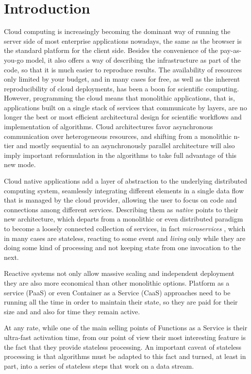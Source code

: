 \documentclass{llncs}
\begin{document}
\section{Introduction}
Cloud computing is increasingly becoming the dominant way of running
the server side of most enterprise applications nowadays, the same as the browser is
the standard platform for the client side. Besides the convenience of the pay-as-you-go
model, it also offers a way of describing the infrastructure as part
of the code, so that it is much easier to reproduce results.
The availability of resources only limited by your budget, and in many
cases for free, as well as the inherent reproducibility of cloud
deployments, has been a boon for scientific computing. However,
programming the cloud means that monolithic applications, that is,
applications built on a single stack of services that communicate by
layers, are no longer the best or most efficient architectural design
for scientific workflows and implementation of algorithms. Cloud
architectures favor asynchronous communication over heterogeneous %
resources, and shifting from a monolithic n-tier and mostly sequential
to an asynchronously parallel architecture will also imply important
reformulation in the algorithms to take full advantage of this new
mode.

  Cloud native applications add a layer of abstraction to the
  underlying distributed computing system, seamlessly integrating
  different elements in a single data flow that is managed by the
  cloud provider, allowing the user to focus on code and connections
  among different services. Describing them as {\em native} points
  to their new architecture, which departs from a monolithic or even
  distributed paradigm to become a loosely connected collection of
services, in fact {\em microservices} \cite{microservices}, which in
 many cases are stateless, reacting to some event and
  {\em living} only while they are doing some kind of processing and
  not keeping state from one invocation to the next.
  
  Reactive systems not only allow massive scaling and independent deployment they
  are also more economical than other monolithic options.  Platform as a service
  (PaaS) or even Container as a Service (CaaS) approaches need to be running all
  the time in order to maintain their state, so they are paid for their size and
  and also for time they remain active.

  At any rate, while one of the main selling points of Functions as a Service is
  their ultra-fast activation time, from our point of view their most interesting
  feature is the fact that they provide stateless processing. An important caveat
  of stateless processing is that algorithms must be adapted to this fact and
  turned, at least in part, into a series of stateless steps that work on a data
  stream.
\end{document}
